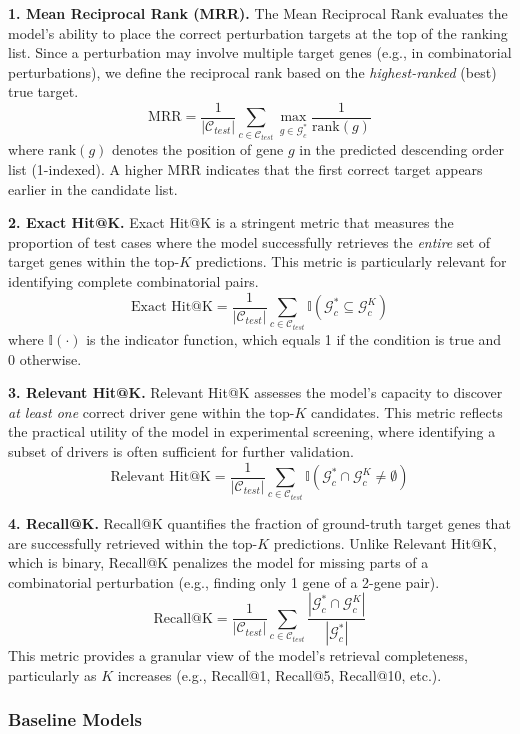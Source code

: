 \documentclass[conference]{IEEEtran}
\begin{document}
\textbf{1. Mean Reciprocal Rank (MRR).} The Mean Reciprocal Rank evaluates the model's ability to place the correct perturbation targets at the top of the ranking list. Since a perturbation may involve multiple target genes (e.g., in combinatorial perturbations), we define the reciprocal rank based on the \textit{highest-ranked} (best) true target.
\[
\text{MRR} = \frac{1}{|\mathcal{C}_{test}|} \sum_{c \in \mathcal{C}_{test}} \max_{g \in \mathcal{G}_c^*} \frac{1}{\text{rank}(g)}
\]
where $\text{rank}(g)$ denotes the position of gene $g$ in the predicted descending order list (1-indexed). A higher MRR indicates that the first correct target appears earlier in the candidate list.

\textbf{2. Exact Hit@K.} Exact Hit@K is a stringent metric that measures the proportion of test cases where the model successfully retrieves the \textit{entire} set of target genes within the top-$K$ predictions. This metric is particularly relevant for identifying complete combinatorial pairs.
\[
\text{Exact Hit@K} = \frac{1}{|\mathcal{C}_{test}|} \sum_{c \in \mathcal{C}_{test}} \mathbb{I}(\mathcal{G}_c^* \subseteq \mathcal{G}_c^K)
\]
where $\mathbb{I}(\cdot)$ is the indicator function, which equals 1 if the condition is true and 0 otherwise.

\textbf{3. Relevant Hit@K.} Relevant Hit@K assesses the model's capacity to discover \textit{at least one} correct driver gene within the top-$K$ candidates. This metric reflects the practical utility of the model in experimental screening, where identifying a subset of drivers is often sufficient for further validation.
\[
\text{Relevant Hit@K} = \frac{1}{|\mathcal{C}_{test}|} \sum_{c \in \mathcal{C}_{test}} \mathbb{I}(\mathcal{G}_c^* \cap \mathcal{G}_c^K \neq \emptyset)
\]

\textbf{4. Recall@K.} Recall@K quantifies the fraction of ground-truth target genes that are successfully retrieved within the top-$K$ predictions. Unlike Relevant Hit@K, which is binary, Recall@K penalizes the model for missing parts of a combinatorial perturbation (e.g., finding only 1 gene of a 2-gene pair).
\[
\text{Recall@K} = \frac{1}{|\mathcal{C}_{test}|} \sum_{c \in \mathcal{C}_{test}} \frac{|\mathcal{G}_c^* \cap \mathcal{G}_c^K|}{|\mathcal{G}_c^*|}
\]
This metric provides a granular view of the model's retrieval completeness, particularly as $K$ increases (e.g., Recall@1, Recall@5, Recall@10, etc.).

\subsubsection{Baseline Models}
\end{document}
